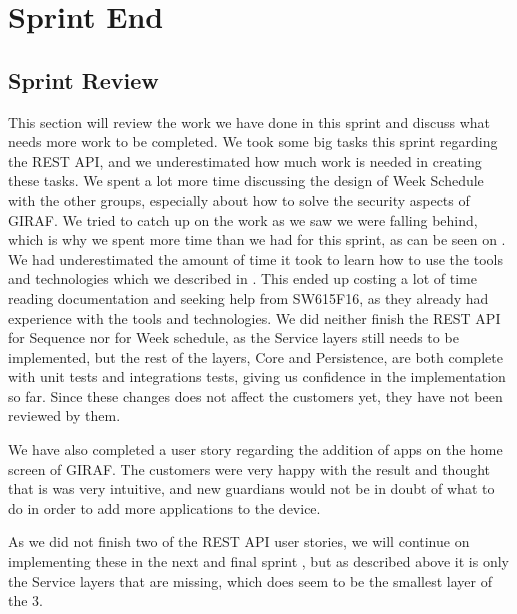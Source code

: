 \chapter{Sprint End}
\section{Sprint Review}\label{sec:sprintreview3}
This section will review the work we have done in this sprint and discuss what needs more work to be completed.
We took some big tasks this sprint regarding the REST API, and we underestimated how much work is needed in creating these tasks.
We spent a lot more time discussing the design of Week Schedule with the other groups, especially about how to solve the security aspects of GIRAF. 
We tried to catch up on the work as we saw we were falling behind, which is why we spent more time than we had for this sprint, as can be seen on .
We had underestimated the amount of time it took to learn how to use the tools and technologies which we described in .
This ended up costing a lot of time reading documentation and seeking help from SW615F16, as they already had experience with the tools and technologies.
We did neither finish the REST API for Sequence nor for Week schedule, as the Service layers still needs to be implemented, but the rest of the layers, Core and Persistence, are both complete with unit tests and integrations tests, giving us confidence in the implementation so far.
Since these changes does not affect the customers yet, they have not been reviewed by them.

We have also completed a user story regarding the addition of apps on the home screen of GIRAF.
The customers were very happy with the result and thought that is was very intuitive, and new guardians would not be in doubt of what to do in order to add more applications to the device.

As we did not finish two of the REST API user stories, we will continue on implementing these in the next and final sprint , but as described above it is only the Service layers that are missing, which does seem to be the smallest layer of the 3.

